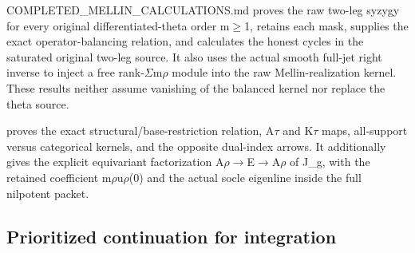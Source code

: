 \documentclass[10pt,a4paper,oneside]{report}
\begin{document}
COMPLETED\_MELLIN\_CALCULATIONS.md proves the raw two-leg syzygy for
every original differentiated-theta order
m\allowbreak{}\ensuremath{≥}\allowbreak{}1, retains each mask, supplies
the exact operator-balancing relation, and calculates the honest cycles
in the saturated original two-leg source. It also uses the actual smooth
full-jet right inverse to inject a free
rank-\allowbreak{}\ensuremath{Σ}\allowbreak{}m\allowbreak{}\ensuremath{ρ}\allowbreak{}
module into the raw Mellin-realization kernel. These results neither
assume vanishing of the balanced kernel nor replace the theta source.

\protect{} proves the exact
structural/base-restriction relation,
A\allowbreak{}\ensuremath{τ}\allowbreak{} and
K\allowbreak{}\ensuremath{τ}\allowbreak{} maps, all-support versus
categorical kernels, and the opposite dual-index arrows. It additionally
gives the explicit equivariant factorization
A\allowbreak{}\ensuremath{ρ}\allowbreak{}\allowbreak{}\ensuremath{→}\allowbreak{}E\allowbreak{}\ensuremath{→}\allowbreak{}A\allowbreak{}\ensuremath{ρ}\allowbreak{}
of J\_g, with the retained coefficient
m\allowbreak{}\ensuremath{ρ}\allowbreak{}u\allowbreak{}\ensuremath{ρ}\allowbreak{}(0)
and the actual socle eigenline inside the full nilpotent packet.

\subsection{Prioritized continuation for
integration}\label{prioritized-continuation-for-integration}
\end{document}
